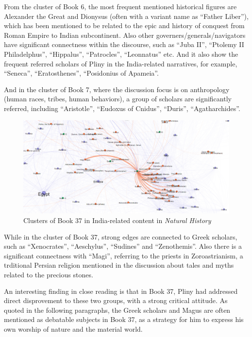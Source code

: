 \documentclass[
  12pt,
]{article}
\begin{document}
From the cluster of Book 6, the most frequent mentioned historical
figures are Alexander the Great and Dionysus (often with a variant name
as ``Father Liber''), which has been mentioned to be related to the epic
and history of conquest from Roman Empire to Indian subcontinent. Also
other governers/generals/navigators have significant connectness within
the discourse, such as ``Juba II'', ``Ptolemy II Philadelphus'',
``Hippalus'', ``Patrocles'', ``Leonnatus'' etc. And it also show the
frequent referred scholars of Pliny in the India-related narratives, for
example, ``Seneca'', ``Eratosthenes'', ``Posidonius of Apameia''.

And in the cluster of Book 7, where the discussion focus is on
anthropology (human races, tribes, human behaviors), a group of scholars
are significantly referred, including ``Aristotle'', ``Eudoxus of
Cnidus'', ``Duris'', ``Agatharchides''.

\begin{figure}

{\centering \includegraphics{NHthesis_structure_files/figure-pdf/fig-network_zoom_book37-output-1.png}

}

\caption{\label{fig-network_zoom_book37}Clusters of Book 37 in
India-related content in \emph{Natural History}}

\end{figure}

While in the cluster of Book 37, strong edges are connected to Greek
scholars, such as ``Xenocrates'', ``Aeschylus'', ``Sudines'' and
``Zenothemis''. Also there is a significant connectness with ``Magi'',
referring to the priests in Zoroastrianism, a trditional Persian
religion mentioned in the discussion about tales and myths related to
the precious stones.

An interesting finding in close reading is that in Book 37, Pliny had
addressed direct disprovement to these two groups, with a strong
critical attitude. As quoted in the following paragraphs, the Greek
scholars and Magus are often mentioned as debatable subjects in Book 37,
as a strategy for him to express his own worship of nature and the
material world.
\end{document}
